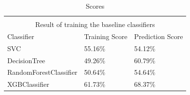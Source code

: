 \setlength{\extrarowheight}{1.5pt}
\begin{table}[!htbp]
\caption{Scores} %
\centering %
\begin{tabular}{|l|l|l|} %
\hline %


\multicolumn{3}{|c|}{}\\
\multicolumn{3}{|c|}{Result of training the baseline classifiers}\\[5pt]
\hline
Classifier & Training Score & Prediction Score\\[0.5ex]
\hline %

SVC     & 55.16\% & 54.12\% \\
DecisionTree       & 49.26\% & 60.79\%\\
RandomForestClassifier   & 50.64\% & 54.64\%\\
XGBClassifier            & 61.73\% & 68.37\%\\

\hline%
\end{tabular}
\label{tableBenchMarkScores}{}
\end{table}

